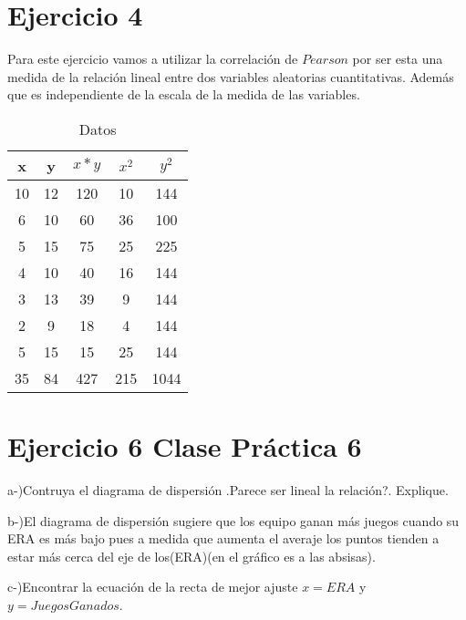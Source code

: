 \documentclass{article}
\begin{document}
	\section*{Ejercicio 4}
		\begin{flushleft}
			Para este ejercicio vamos a utilizar la correlaci\'on de $Pearson$ por ser esta una medida de la relaci\'on lineal entre dos variables aleatorias cuantitativas. Adem\'as que es independiente de la escala de la medida de las variables.
		\end{flushleft}

		\begin{table}
		\caption{Datos}
		\centering
		\begin{tabular}{|c|c|c|c|c|}
			\hline
			x & y & $x*y$ & $x^2$ & $y^2$ \\
			\hline
			10 & 12 & 120 & 10 & 144 \\
			\hline
			6 & 10 & 60 & 36 & 100 \\
			\hline
			5 & 15 & 75 & 25 & 225 \\
			\hline
			4 & 10 & 40 & 16 & 144 \\
			\hline
			3 & 13 & 39 & 9 & 144 \\
			\hline
			2 & 9 & 18 & 4 & 144 \\
			\hline
			5 & 15 & 15 & 25 & 144 \\
			\hline
			35 & 84 & 427 & 215 & 1044 \\
			\hline
		\end{tabular}
	    \end{table}
	
	\section*{Ejercicio 6 Clase Pr\'actica 6 }

		\begin{flushleft}
			a-)Contruya el diagrama de dispersi\'on .Parece ser lineal la relaci\'on?. Explique.
		\end{flushleft}

		\begin{flushleft}
			b-)El diagrama de dispersi\'on sugiere que los equipo ganan m\'as juegos cuando su ERA es m\'as bajo pues a medida que aumenta el averaje los puntos tienden a estar m\'as cerca del eje de los(ERA)(en el gr\'afico es a las absisas).
		\end{flushleft}

		\begin{flushleft}
			c-)Encontrar la ecuaci\'on de la recta de mejor ajuste $x = ERA$ y $y = Juegos Ganados$.
		\end{flushleft}
\end{document}
